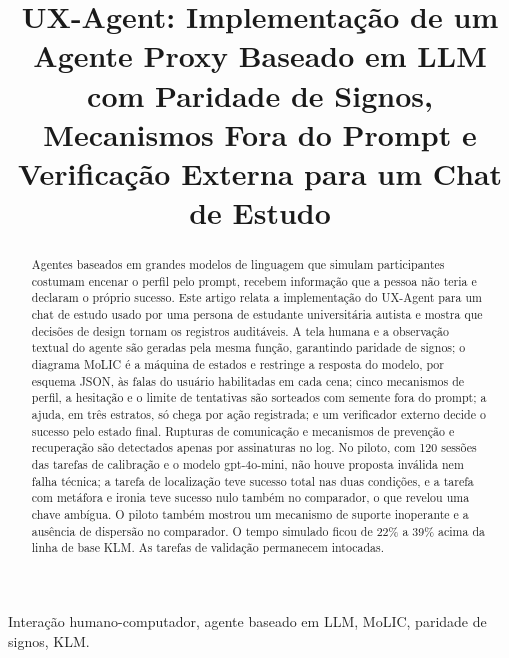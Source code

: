 \documentclass[conference]{IEEEtran}
\begin{document}
\title{UX-Agent: Implementação de um Agente Proxy Baseado em LLM com Paridade de Signos, Mecanismos Fora do Prompt e Verificação Externa para um Chat de Estudo}

\author{
\and
{}
\and
{}
}
\maketitle

\begin{abstract}
Agentes baseados em grandes modelos de linguagem que simulam participantes costumam encenar o perfil pelo prompt, recebem informação que a pessoa não teria e declaram o próprio sucesso. Este artigo relata a implementação do UX-Agent para um chat de estudo usado por uma persona de estudante universitária autista e mostra que decisões de design tornam os registros auditáveis. A tela humana e a observação textual do agente são geradas pela mesma função, garantindo paridade de signos; o diagrama MoLIC é a máquina de estados e restringe a resposta do modelo, por esquema JSON, às falas do usuário habilitadas em cada cena; cinco mecanismos de perfil, a hesitação e o limite de tentativas são sorteados com semente fora do prompt; a ajuda, em três estratos, só chega por ação registrada; e um verificador externo decide o sucesso pelo estado final. Rupturas de comunicação e mecanismos de prevenção e recuperação são detectados apenas por assinaturas no log. No piloto, com 120 sessões das tarefas de calibração e o modelo gpt-4o-mini, não houve proposta inválida nem falha técnica; a tarefa de localização teve sucesso total nas duas condições, e a tarefa com metáfora e ironia teve sucesso nulo também no comparador, o que revelou uma chave ambígua. O piloto também mostrou um mecanismo de suporte inoperante e a ausência de dispersão no comparador. O tempo simulado ficou de 22\% a 39\% acima da linha de base KLM. As tarefas de validação permanecem intocadas.
\end{abstract}

\begin{IEEEkeywords}
Interação humano-computador, agente baseado em LLM, MoLIC, paridade de signos, KLM.
\end{IEEEkeywords}






\end{document}
